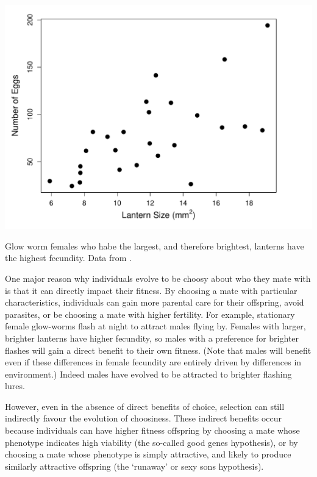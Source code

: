 \begin{marginfigure}
\begin{center}
\includegraphics[width= \textwidth]{Journal_figs/Quant_gen/glow_worm_flashes/glow_worm_flashes.pdf}
\end{center}
\caption{Glow worm females who habe the largest, and therefore
  brightest, lanterns have the highest fecundity. Data from \citet{hopkins2015m}. } \label{fig:glow_worms_lantern}
\end{marginfigure}


One major reason why individuals evolve to be choosy about who they mate with is
that it can directly impact their fitness. By choosing a mate with
particular characteristics, individuals can gain more parental care for
their offspring, avoid parasites, or be choosing a mate with higher
fertility. For example, stationary female glow-worms flash at night to attract
males flying by. Females with larger, brighter lanterns have higher fecundity, so
males with a preference for brighter flashes will gain a direct benefit to
their own fitness. (Note that males will benefit even if these
differences in female fecundity are entirely driven by differences in
environment.) Indeed males have evolved to be attracted to brighter
flashing lures.  


However, even in the absence of direct benefits of choice, selection
can still indirectly favour the evolution of choosiness. These
indirect benefits occur because individuals can have higher fitness
offspring by choosing a mate whose phenotype indicates high viability
(the so-called good genes hypothesis), or by choosing a mate whose
phenotype is simply attractive, and likely to produce similarly
attractive offspring (the `runaway' or sexy sons hypothesis).


